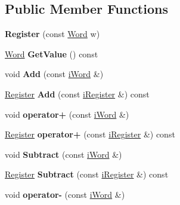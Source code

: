 \subsection*{Public Member Functions}
\begin{DoxyCompactItemize}
\item 
\hypertarget{classRegister_a6aea43b4c4ad669073f20fbcd274b49c}{
{\bfseries Register} (const \hyperlink{classWord}{Word} w)}
\label{classRegister_a6aea43b4c4ad669073f20fbcd274b49c}

\item 
\hypertarget{classRegister_a379734c28ab8258ce528a96de24cfa1a}{
\hyperlink{classWord}{Word} {\bfseries GetValue} () const }
\label{classRegister_a379734c28ab8258ce528a96de24cfa1a}

\item 
\hypertarget{classRegister_a0dd8ed2fdfff423b6f545f8ed5640416}{
void {\bfseries Add} (const \hyperlink{classiWord}{iWord} \&)}
\label{classRegister_a0dd8ed2fdfff423b6f545f8ed5640416}

\item 
\hypertarget{classRegister_ae77a60fdd812c0c714079d23f6413e32}{
\hyperlink{classRegister}{Register} {\bfseries Add} (const \hyperlink{classiRegister}{iRegister} \&) const }
\label{classRegister_ae77a60fdd812c0c714079d23f6413e32}

\item 
\hypertarget{classRegister_abc659fbe3ff01c1699397e955b855538}{
void {\bfseries operator+} (const \hyperlink{classiWord}{iWord} \&)}
\label{classRegister_abc659fbe3ff01c1699397e955b855538}

\item 
\hypertarget{classRegister_ab7a09bc613dd8ce801c411d875502e4b}{
\hyperlink{classRegister}{Register} {\bfseries operator+} (const \hyperlink{classiRegister}{iRegister} \&) const }
\label{classRegister_ab7a09bc613dd8ce801c411d875502e4b}

\item 
\hypertarget{classRegister_a1d7b39b6a279700bc30dd6b303c508f9}{
void {\bfseries Subtract} (const \hyperlink{classiWord}{iWord} \&)}
\label{classRegister_a1d7b39b6a279700bc30dd6b303c508f9}

\item 
\hypertarget{classRegister_a75cf10d9af24894693a5ce02e97cf705}{
\hyperlink{classRegister}{Register} {\bfseries Subtract} (const \hyperlink{classiRegister}{iRegister} \&) const }
\label{classRegister_a75cf10d9af24894693a5ce02e97cf705}

\item 
\hypertarget{classRegister_ae80c5acbf654037c0677a6dec824501c}{
void {\bfseries operator-\/} (const \hyperlink{classiWord}{iWord} \&)}
\label{classRegister_ae80c5acbf654037c0677a6dec824501c}


\end{DoxyCompactItemize}
